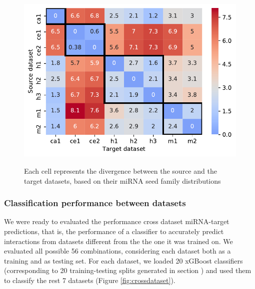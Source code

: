 \documentclass{bmcart}
\begin{document}

\begin{figure}[h!]
  \caption{ Each cell represents the divergence between the source and the target datasets, based on their miRNA seed family distributions}
      \includegraphics[width = 1\textwidth]{Results/divergence.pdf}
      \label{fig:divergence}
      \end{figure}


\subsubsection*{Classification performance between datasets}
We were ready to evaluated the performance cross dataset miRNA-target predictions, that is, the performance of a classifier to accurately predict interactions from datasets different from the the one it was trained on.
We evaluated all possible 56 combinations, considering each dataset both as a training and as testing set. 
For each dataset, we loaded 20 xGBoost classifiers (corresponding to 20 training-testing splits generated in section ) and used them to classify the rest 7 datasets (Figure \ref{fig:crossdataset}). 
\end{document}
